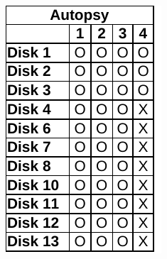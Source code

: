 \begin{paraphrase}
\begin{figure}
    \begin{subfigure}[t]{0.17\linewidth}
        \includegraphics[width=\linewidth]{fig/autopsy_results_ntfs.pdf}
    \end{subfigure}~~
    \begin{subfigure}[t]{0.17\linewidth}

\end{subfigure}
\end{figure}
\end{paraphrase}

